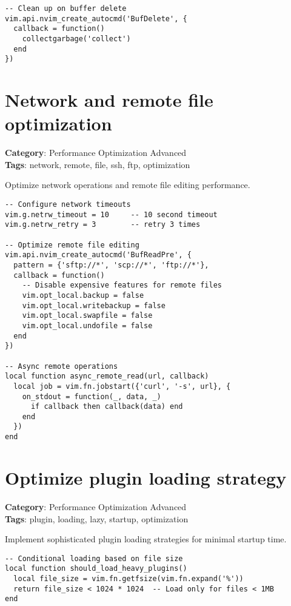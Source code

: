 {{{{{{{{{{\begin{Exa*}{}
\begin{Verbatim}[fontsize=\footnotesize, breaklines, breakanywhere]
-- Clean up on buffer delete
vim.api.nvim_create_autocmd('BufDelete', {
  callback = function()
    collectgarbage('collect')
  end
})
\end{Verbatim}
\end{Exa*}

\section{Network and remote file optimization}

\textbf{Category}: Performance Optimization Advanced\\ \textbf{Tags}: network, remote, file, ssh, ftp, optimization
\vspace{0.5cm}

Optimize network operations and remote file editing performance.

\begin{Exa*}{}
\begin{Verbatim}[fontsize=\footnotesize, breaklines, breakanywhere]
-- Configure network timeouts
vim.g.netrw_timeout = 10     -- 10 second timeout
vim.g.netrw_retry = 3        -- retry 3 times

-- Optimize remote file editing
vim.api.nvim_create_autocmd('BufReadPre', {
  pattern = {'sftp://*', 'scp://*', 'ftp://*'},
  callback = function()
    -- Disable expensive features for remote files
    vim.opt_local.backup = false
    vim.opt_local.writebackup = false
    vim.opt_local.swapfile = false
    vim.opt_local.undofile = false
  end
})

-- Async remote operations
local function async_remote_read(url, callback)
  local job = vim.fn.jobstart({'curl', '-s', url}, {
    on_stdout = function(_, data, _)
      if callback then callback(data) end
    end
  })
end
\end{Verbatim}
\end{Exa*}

\section{Optimize plugin loading strategy}

\textbf{Category}: Performance Optimization Advanced\\ \textbf{Tags}: plugin, loading, lazy, startup, optimization
\vspace{0.5cm}

Implement sophisticated plugin loading strategies for minimal startup time.

\begin{Exa*}{}
\begin{Verbatim}[fontsize=\footnotesize, breaklines, breakanywhere]
-- Conditional loading based on file size
local function should_load_heavy_plugins()
  local file_size = vim.fn.getfsize(vim.fn.expand('%'))
  return file_size < 1024 * 1024  -- Load only for files < 1MB
end


\end{Verbatim}
\end{Exa*}}}}}}}}}}}
